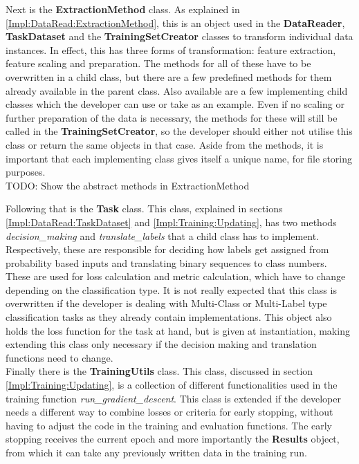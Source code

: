 Next is the \textbf{ExtractionMethod} class. As explained in \ref{Impl:DataRead:ExtractionMethod}, this is an object used in the \textbf{DataReader}, \textbf{TaskDataset} and the \textbf{TrainingSetCreator} classes to transform individual data instances. In effect, this has three forms of transformation: feature extraction, feature scaling and preparation. The methods for all of these have to be overwritten in a child class, but there are a few predefined methods for them already available in the parent class. Also available are a few implementing child classes which the developer can use or take as an example. Even if no scaling or further preparation of the data is necessary, the methods for these will still be called in the \textbf{TrainingSetCreator}, so the developer should either not utilise this class or return the same objects in that case. Aside from the methods, it is important that each implementing class gives itself a unique name, for file storing purposes.\\
TODO: Show the abstract methods in ExtractionMethod

Following that is the \textbf{Task} class. This class, explained in sections \ref{Impl:DataRead:TaskDataset} and \ref{Impl:Training:Updating}, has two methods \textit{decision\_making} and \textit{translate\_labels} that a child class has to implement. Respectively, these are responsible for deciding how labels get assigned from probability based inputs and translating binary sequences to class numbers. These are used for loss calculation and metric calculation, which have to change depending on the classification type. It is not really expected that this class is overwritten if the developer is dealing with Multi-Class or Multi-Label type classification tasks as they already contain implementations. This object also holds the loss function for the task at hand, but is given at instantiation, making extending this class only necessary if the decision making and translation functions need to change.\\

Finally there is the \textbf{TrainingUtils} class. This class, discussed in section \ref{Impl:Training:Updating}, is a collection of different functionalities used in the training function \textit{run\_gradient\_descent}. This class is extended if the developer needs a different way to combine losses or criteria for early stopping, without having to adjust the code in the training and evaluation functions. The early stopping receives the current epoch and more importantly the \textbf{Results} object, from which it can take any previously written data in the training run. \\
